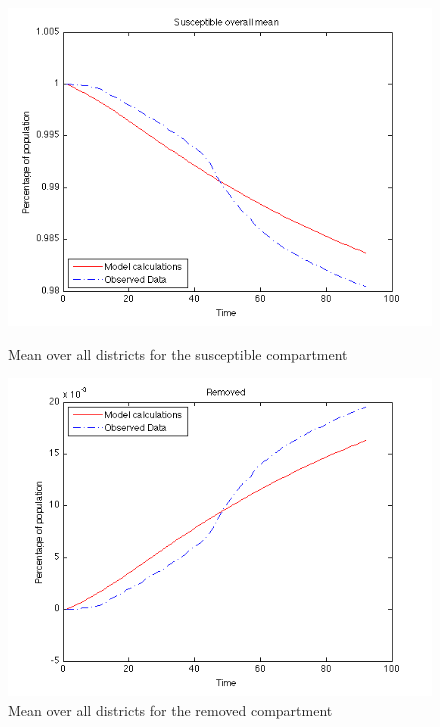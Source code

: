 \documentclass[11pt]{article}
\begin{document}
\begin{figure}
  \begin{minipage}[t]{0.49\textwidth}
    \centering
    \includegraphics[width=\textwidth]{Bilder/susceptible_mean.png} 
    \caption{Mean over all districts for the susceptible compartment}
	\label{fig:mean_susceptible}
  \end{minipage}
  \hspace{0.02\textwidth}
  \begin{minipage}[t]{0.49\textwidth}
    \centering
    \includegraphics[width=\textwidth]{Bilder/removed_mean.png} 
    \caption{Mean over all districts for the removed compartment}
	\label{fig:mean_removed}
  \end{minipage}
\end{figure}
\end{document}
